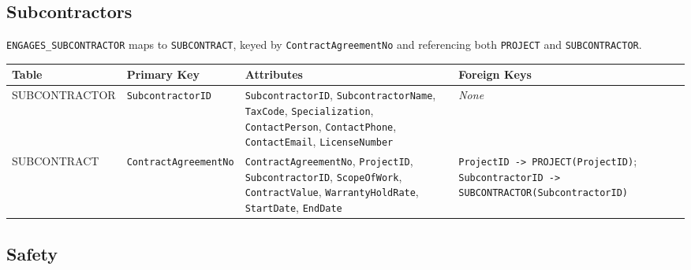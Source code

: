 \documentclass[a4paper,12pt]{report}
\newcounter{none} %
\begin{document}
\subsection{Subcontractors}\label{subcontractors}

\texttt{ENGAGES\_\allowbreak{}SUBCONTRACTOR} maps to \texttt{SUBCONTRACT}, keyed by \texttt{ContractAgreementNo} and referencing both \texttt{PROJECT} and \texttt{SUBCONTRACTOR}.

{\def\LTcaptype{none} %
\begin{longtable}[]{@{}
  >{\raggedright\arraybackslash}p{}
  >{\raggedright\arraybackslash}p{}
  >{\raggedright\arraybackslash}p{}
  >{\raggedright\arraybackslash}p{}@{}}
\toprule\noalign{}
\begin{minipage}[b]{\linewidth}\raggedright
Table
\end{minipage} & \begin{minipage}[b]{\linewidth}\raggedright
Primary Key
\end{minipage} & \begin{minipage}[b]{\linewidth}\raggedright
Attributes
\end{minipage} & \begin{minipage}[b]{\linewidth}\raggedright
Foreign Keys
\end{minipage} \\
\midrule\noalign{}
\endhead
\bottomrule\noalign{}
\endlastfoot
SUBCONTRACTOR & \texttt{SubcontractorID} & \texttt{SubcontractorID}, \texttt{SubcontractorName}, \texttt{TaxCode}, \texttt{Specialization}, \texttt{ContactPerson}, \texttt{ContactPhone}, \texttt{ContactEmail}, \texttt{LicenseNumber} & \emph{None} \\
SUBCONTRACT & \texttt{ContractAgreementNo} & \texttt{ContractAgreementNo}, \texttt{ProjectID}, \texttt{SubcontractorID}, \texttt{ScopeOfWork}, \texttt{ContractValue}, \texttt{WarrantyHoldRate}, \texttt{StartDate}, \texttt{EndDate} & \texttt{ProjectID -\textgreater{} PROJECT(\allowbreak{}\allowbreak{}ProjectID)}; \texttt{SubcontractorID -\textgreater{} SUBCONTRACTOR(\allowbreak{}\allowbreak{}SubcontractorID)} \\
\end{longtable}
}

\subsection{Safety}\label{safety}
\end{document}
